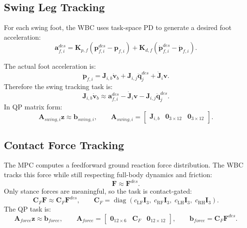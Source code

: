 \documentclass[11pt,a4paper]{article}
\newcommand{\diag}{\operatorname{diag}}
\begin{document}
\subsection{Swing Leg Tracking}

For each swing foot, the WBC uses task-space PD to generate a desired foot acceleration:
\begin{equation}
	\bm{a}_{f,i}^{des}
	=
	\bm{K}_{p,f}
	\left(
		\bm{p}_{f,i}^{des}-\bm{p}_{f,i}
	\right)
	+
	\bm{K}_{d,f}
	\left(
		\dot{\bm{p}}_{f,i}^{des}-\dot{\bm{p}}_{f,i}
	\right).
\end{equation}

The actual foot acceleration is:
\begin{equation}
	\ddot{\bm{p}}_{f,i}
	=
	\bm{J}_{i,b}\dot{\bm{v}}_b
	+
	\bm{J}_{i,j}\ddot{\bm{q}}_j^{des}
	+
	\dot{\bm{J}}_i\bm{v}.
\end{equation}
Therefore the swing tracking task is:
\begin{equation}
	\bm{J}_{i,b}\dot{\bm{v}}_b
	\approx
	\bm{a}_{f,i}^{des}
	-
	\dot{\bm{J}}_i\bm{v}
	-
	\bm{J}_{i,j}\ddot{\bm{q}}_j^{des}.
\end{equation}
In QP matrix form:
\begin{equation}
	\bm{A}_{swing,i}\bm{z}
	\approx
	\bm{b}_{swing,i},
	\qquad
	\bm{A}_{swing,i}
	=
	\begin{bmatrix}
		\bm{J}_{i,b} & \bm{0}_{3\times12} & \bm{0}_{3\times12}
	\end{bmatrix}.
\end{equation}

\subsection{Contact Force Tracking}

The MPC computes a feedforward ground reaction force distribution. The WBC tracks this force while still respecting full-body dynamics and friction:
\begin{equation}
	\bm{F}
	\approx
	\bm{F}^{des}.
\end{equation}
Only stance forces are meaningful, so the task is contact-gated:
\begin{equation}
	\bm{C}_F\bm{F}
	\approx
	\bm{C}_F\bm{F}^{des},
	\qquad
	\bm{C}_F
	=
	\diag(c_{\text{LF}}\bm{I}_3,\;
	      c_{\text{RF}}\bm{I}_3,\;
	      c_{\text{LH}}\bm{I}_3,\;
	      c_{\text{RH}}\bm{I}_3).
\end{equation}
The QP task is:
\begin{equation}
	\bm{A}_{force}\bm{z}
	\approx
	\bm{b}_{force},
	\qquad
	\bm{A}_{force}
	=
	\begin{bmatrix}
		\bm{0}_{12\times6} & \bm{C}_F & \bm{0}_{12\times12}
	\end{bmatrix},
	\qquad
	\bm{b}_{force}
	=
	\bm{C}_F\bm{F}^{des}.
\end{equation}
\end{document}
